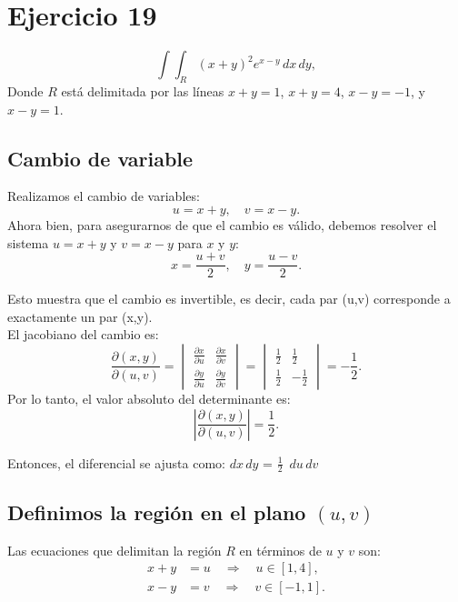 \documentclass{article}
\begin{document}
	
	\section*{Ejercicio 19}
	
	\[
	\int\int_R (x + y)^2 e^{x - y} \, dx \, dy,
	\]
	Donde \( R \) está delimitada por las líneas \( x + y = 1 \), \( x + y = 4 \), \( x - y = -1 \), y \( x - y = 1 \).
	
	\subsection*{Cambio de variable}
	Realizamos el cambio de variables:
	\[
	u = x + y, \quad v = x - y.
	\]
	Ahora bien, para asegurarnos de que el cambio es válido, debemos resolver el sistema $u=x+y$ y $v=x-y$ para $x$ y $y$:
	\[
	x = \frac{u + v}{2}, \quad y = \frac{u - v}{2}.
	\]
	
	Esto muestra que el cambio es invertible, es decir, cada par (u,v) corresponde a exactamente un par (x,y).\\
	
	El jacobiano del cambio es:
	\[
	\frac{\partial(x, y)}{\partial(u, v)} = 
	\begin{vmatrix}
		\frac{\partial x}{\partial u} & \frac{\partial x}{\partial v} \\
		\frac{\partial y}{\partial u} & \frac{\partial y}{\partial v}
	\end{vmatrix} =
	\begin{vmatrix}
		\frac{1}{2} & \frac{1}{2} \\
		\frac{1}{2} & -\frac{1}{2}
	\end{vmatrix} = -\frac{1}{2}.
	\]
	Por lo tanto, el valor absoluto del determinante es:
	\[
	\left| \frac{\partial(x, y)}{\partial(u, v)} \right| = \frac{1}{2}.
	\]
	
	Entonces, el diferencial se ajusta como: $dx \, dy$ = $\frac{1}{2}$ $\, du \, dv$
	
	
	\subsection*{Definimos la región en el plano \( (u, v) \)}
	Las ecuaciones que delimitan la región \( R \) en términos de \( u \) y \( v \) son:
	\begin{align*}
		x + y &= u \quad \Rightarrow \quad u \in [1, 4], \\
		x - y &= v \quad \Rightarrow \quad v \in [-1, 1].
	\end{align*}
	
\end{document}
